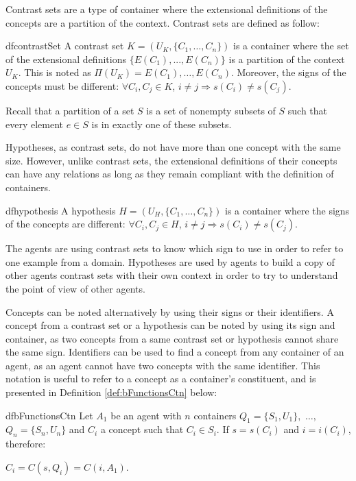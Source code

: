 Contrast sets are a type of container where the extensional definitions of the concepts are a partition of the context. Contrast sets are defined as follow:

\begin{restatable}{df}{contrastSet}
\label{def:Cset}
A contrast set $K = (U_{K}, \{ C_{1}, \ldots ,C_{n} \})$ is a container where the set of the extensional definitions $\{E(C_{1}), ... , E(C_{n})\}$ is a partition of the context $U_{K}$. This is noted as $\Pi(U_{K})= E(C_{1}), \ldots , E(C_{n})$. Moreover, the signs of the concepts must be different: $\forall C_{i},C_{j} \in K$, $i \neq j \Rightarrow s(C_{i}) \neq s(C_{j})$.
\end{restatable}

Recall that a partition of a set $S$ is a set of nonempty subsets of $S$ such that every element $e \in S$ is in exactly one of these subsets.

Hypotheses, as contrast sets, do not have more than one concept with the same size. However, unlike contrast sets, the extensional definitions of their concepts can have any relations as long as they remain compliant with the definition of containers.

\begin{restatable}[Hypothesis]{df}{hypothesis}
\label{def:Hyp}
A hypothesis $H = (U_{H}, \{ C_{1}, \ldots ,C_{n} \} )$ is a container where the signs of the concepts are different: $\forall C_{i},C_{j} \in H$, $i \neq j \Rightarrow s(C_{i}) \neq s(C_{j})$.
\end{restatable}

The agents are using contrast sets to know which sign to use in order to refer to one example from a domain. Hypotheses are used by agents to build a copy of other agents contrast sets with their own context in order to try to understand the point of view of other agents.

Concepts can be noted alternatively by using their signs or their identifiers. A concept from a contrast set or a hypothesis can be noted by using its sign and container, as two concepts from a same contrast set or hypothesis cannot share the same sign. Identifiers can be used to find a concept from any container of an agent, as an agent cannot have two concepts with the same identifier. This notation is useful to refer to a concept as a container's constituent, and is presented in Definition \ref{def:bFunctionsCtn} below:

\begin{restatable}{df}{bFunctionsCtn}
\label{def:bFunctionsCtn}
Let $A_{1}$ be an agent with $n$ containers $Q_{1} = \{S_{1}, U_{1} \},$ $\ldots,$ $Q_{n} = \{ S_{n}, U_{n}\}$ and $C_{i}$ a concept such that $C_{i} \in S_{i}$. If $s = s(C_{i})$ and $i = i(C_{i})$, therefore:

\begin{center}
    $C_{i} = C(s, Q_{i}) = C(i,A_{1})$.
\end{center}

\end{restatable}

